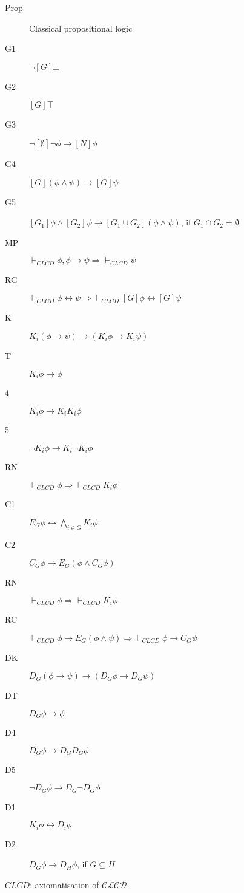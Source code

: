 \documentclass{article}
\newcommand{\acro}[1]{\ensuremath{\mathcal{#1}}}
\begin{document}
\begin{figure}[h]
  \centering
\begin{description}
\item[Prop] Classical propositional logic
\item[G1] $\neg [G] \bot$
\item[G2] $[G] \top$
\item[G3] $\neg [\emptyset] \neg \phi \rightarrow [N] \phi$
\item[G4] $[G] (\phi \wedge \psi) \rightarrow [G] \psi$
\item[G5] $[G_1]\phi \wedge [G_2]\psi \rightarrow [G_1 \cup G_2] (\phi \wedge \psi)$, if $G_1 \cap G_2 = \emptyset$
\item[MP] $\vdash_{CLCD} \phi, \phi \rightarrow \psi \Rightarrow \vdash_{CLCD}  \psi$
\item[RG] $\vdash_{CLCD} \phi \leftrightarrow \psi \Rightarrow \vdash_{CLCD} [G] \phi \leftrightarrow [G] \psi $
\item[K] $K_i (\phi \rightarrow \psi) \rightarrow (K_i \phi \rightarrow K_i \psi)$
\item[T] $K_i \phi \rightarrow \phi$
\item[4] $K_i \phi \rightarrow K_i K_i \phi$
\item[5] $\neg K_i \phi \rightarrow K_i \neg K_i \phi$
\item[RN] $\vdash_{CLCD} \phi \Rightarrow \vdash_{CLCD} K_i \phi$
\item[C1] $E_G \phi \leftrightarrow  \bigwedge_{i \in G} K_i \phi$
\item[C2] $C_G  \phi \rightarrow E_G(\phi \wedge C_G \phi)$
\item[RN] $\vdash_{CLCD} \phi \Rightarrow \vdash_{CLCD} K_i \phi$
\item[RC] $\vdash_{CLCD} \phi \rightarrow E_G(\phi \wedge \psi) \Rightarrow \vdash_{CLCD} \phi \rightarrow C_G \psi$
\item[DK] $D_G (\phi \rightarrow \psi) \rightarrow (D_G \phi \rightarrow D_G \psi)$
\item[DT] $D_G \phi \rightarrow \phi$
\item[D4] $D_G \phi \rightarrow D_G D_G \phi$
\item[D5] $\neg D_G \phi \rightarrow D_G \neg D_G \phi$
\item[D1] $K_i \phi \leftrightarrow D_i \phi$
\item[D2] $D_G \phi \rightarrow D_H\phi$, if $G \subseteq H$
\end{description}
  \caption{$CLCD$: axiomatisation of \acro{CLCD}.}
  \label{fig:clcd-ax}
\end{figure}
\end{document}
